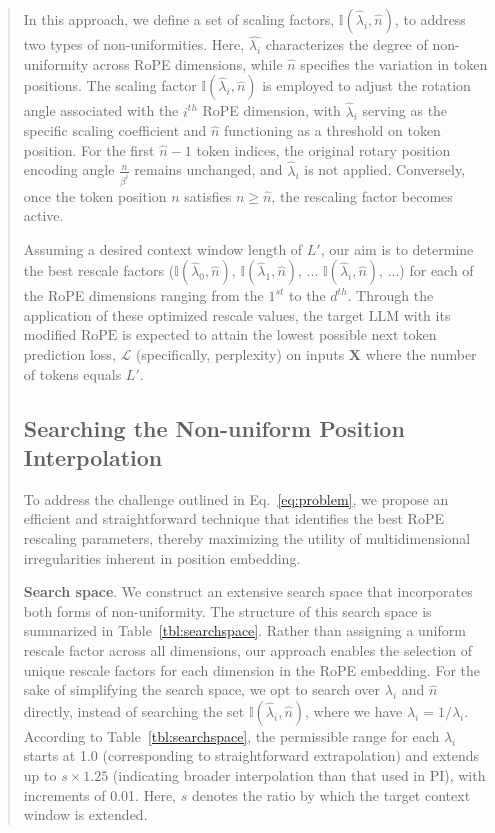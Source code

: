\begin{abstract}
In this approach, we define a set of scaling factors, $\mathbb{I}(\hat{\lambda}_{i},\hat{n})$, to address two types of non-uniformities. Here, $\hat{\lambda_i}$ characterizes the degree of non-uniformity across RoPE dimensions, while $\hat{n}$ specifies the variation in token positions. The scaling factor $\mathbb{I}(\hat{\lambda}_{i},\hat{n})$ is employed to adjust the rotation angle associated with the $i^{th}$ RoPE dimension, with $\hat\lambda_{i}$ serving as the specific scaling coefficient and $\hat{n}$ functioning as a threshold on token position. For the first $\hat{n}-1$ token indices, the original rotary position encoding angle $\frac{n}{\beta^i}$ remains unchanged, and $\hat\lambda_{i}$ is not applied. Conversely, once the token position $n$ satisfies $n \ge \hat{n}$, the rescaling factor becomes active.

Assuming a desired context window length of $L'$, our aim is to determine the best rescale factors ($\mathbb{I}(\hat{\lambda}_{0},\hat{n})$, $\mathbb{I}(\hat{\lambda}_{1},\hat{n})$, ... $\mathbb{I}(\hat{\lambda}_{i},\hat{n})$, ...) for each of the RoPE dimensions ranging from the $1^{st}$ to the $d^{th}$. Through the application of these optimized rescale values, the target $\text{LLM}$ with its modified $\text{RoPE}$ is expected to attain the lowest possible next token prediction loss, $\mathcal{L}$ (specifically, perplexity) on inputs $\mathbf{X}$ where the number of tokens equals $L'$.

\subsection{Searching the Non-uniform Position Interpolation}

To address the challenge outlined in Eq.~\ref{eq:problem}, we propose an efficient and straightforward technique that identifies the best RoPE rescaling parameters, thereby maximizing the utility of multidimensional irregularities inherent in position embedding.

\textbf{Search space}. We construct an extensive search space that incorporates both forms of non-uniformity. The structure of this search space is summarized in Table~\ref{tbl:searchspace}. Rather than assigning a uniform rescale factor across all dimensions, our approach enables the selection of unique rescale factors for each dimension in the RoPE embedding. For the sake of simplifying the search space, we opt to search over $\lambda_i$ and $\hat{n}$ directly, instead of searching the set $\mathbb{I}(\hat{\lambda}_{i},\hat{n})$, where we have $\hat{\lambda}_{i} = 1/\lambda_i$. According to Table~\ref{tbl:searchspace}, the permissible range for each $\lambda_i$ starts at 1.0 (corresponding to straightforward extrapolation) and extends up to $s\times1.25$ (indicating broader interpolation than that used in PI), with increments of 0.01. Here, $s$ denotes the ratio by which the target context window is extended.


\end{abstract}
